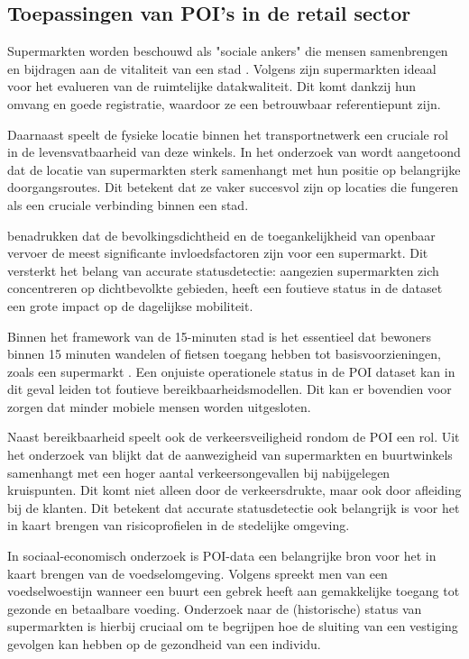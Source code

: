 \subsection{Toepassingen van POI's in de retail sector}
Supermarkten worden beschouwd als "sociale ankers" die mensen samenbrengen en bijdragen aan de vitaliteit van een stad \autocite{Chen2026}. Volgens \textcite{Ballantyne2024} zijn supermarkten ideaal voor het evalueren van de ruimtelijke datakwaliteit. Dit komt dankzij hun omvang en goede registratie, waardoor ze een betrouwbaar referentiepunt zijn.

Daarnaast speelt de fysieke locatie binnen het transportnetwerk een cruciale rol in de levensvatbaarheid van deze winkels. In het onderzoek van \textcite{Lin2018} wordt aangetoond dat de locatie van supermarkten sterk samenhangt met hun positie op belangrijke doorgangsroutes. Dit betekent dat ze vaker succesvol zijn op locaties die fungeren als een cruciale verbinding binnen een stad.

\textcite{Fang2024} benadrukken dat de bevolkingsdichtheid en de toegankelijkheid van openbaar vervoer de meest significante invloedsfactoren zijn voor een supermarkt. Dit versterkt het belang van accurate statusdetectie: aangezien supermarkten zich concentreren op dichtbevolkte gebieden, heeft een foutieve status in de dataset een grote impact op de dagelijkse mobiliteit.

Binnen het framework van de 15-minuten stad is het essentieel dat bewoners binnen 15 minuten wandelen of fietsen toegang hebben tot basisvoorzieningen, zoals een supermarkt \autocite{Poliakov2025}. Een onjuiste operationele status in de POI dataset kan in dit geval leiden tot foutieve bereikbaarheidsmodellen. Dit kan er bovendien voor zorgen dat minder mobiele mensen worden uitgesloten.

Naast bereikbaarheid speelt ook de verkeersveiligheid rondom de POI een rol. Uit het onderzoek van \textcite{Nakao2025} blijkt dat de aanwezigheid van supermarkten en buurtwinkels samenhangt met een hoger aantal verkeersongevallen bij nabijgelegen kruispunten. Dit komt niet alleen door de verkeersdrukte, maar ook door afleiding bij de klanten. Dit betekent dat accurate statusdetectie ook belangrijk is voor het in kaart brengen van risicoprofielen in de stedelijke omgeving. 

In sociaal-economisch onderzoek is POI-data een belangrijke bron voor het in kaart brengen van de voedselomgeving. Volgens \textcite{Vandevijvere2023} spreekt men van een voedselwoestijn wanneer een buurt een gebrek heeft aan gemakkelijke toegang tot gezonde en betaalbare voeding. Onderzoek naar de (historische) status van supermarkten is hierbij cruciaal om te begrijpen hoe de sluiting van een vestiging gevolgen kan hebben op de gezondheid van een individu.

